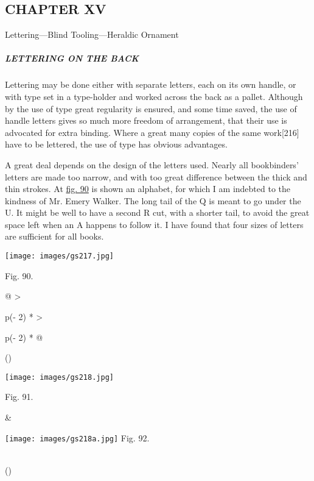 \documentclass[
]{article}
\begin{document}
\hypertarget{chapter-xv}{%
\subsection[CHAPTER
XV]{\texorpdfstring{\protect\hypertarget{CHAPTER_XV}{}{}CHAPTER
XV}{CHAPTER XV}}\label{chapter-xv}}

Lettering---Blind Tooling---Heraldic Ornament

\hypertarget{lettering-on-the-back}{%
\subparagraph{LETTERING ON THE BACK}\label{lettering-on-the-back}}

{Lettering} may be done either with separate letters, each on its own
handle, or with type set in a type-holder and worked across the back as
a pallet. Although by the use of type great regularity is ensured, and
some time saved, the use of handle letters gives so much more freedom of
arrangement, that their use is advocated for extra binding. Where a
great many copies of the same
work{\protect\hypertarget{Page_216}{}{{[}216{]}}} have to be lettered,
the use of type has obvious advantages.

A great deal depends on the design of the letters used. Nearly all
bookbinders' letters are made too narrow, and with too great difference
between the thick and thin strokes. At \protect\hyperlink{Fig_90}{fig.
90} is shown an alphabet, for which I am indebted to the kindness of Mr.
Emery Walker. The long tail of the Q is meant to go under the U. It
might be well to have a second R cut, with a shorter tail, to avoid the
great space left when an A happens to follow it. I have found that four
sizes of letters are sufficient for all
books.\protect\hypertarget{Fig_91}{}{}

\protect\hypertarget{Fig_90}{}{}
\texttt{[image: images/gs217.jpg]}

Fig. 90.

\begin{longtable}[]{@{}
  >{\raggedright\arraybackslash}p{(\columnwidth - 2\tabcolsep) * }
  >{\raggedright\arraybackslash}p{(\columnwidth - 2\tabcolsep) * }@{}}
\toprule()
\endhead
\begin{minipage}[t]{\linewidth}\raggedright
\texttt{[image: images/gs218.jpg]}

Fig. 91.
\end{minipage} & \begin{minipage}[t]{\linewidth}\raggedright
\protect\hypertarget{Fig_92}{}{}
\texttt{[image: images/gs218a.jpg]}
{Fig. 92.}
\end{minipage} \\
\bottomrule()
\end{longtable}
\end{document}
